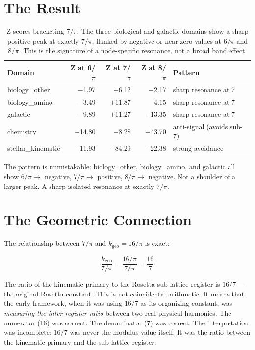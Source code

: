 \documentclass[11pt, letterpaper, openany]{book}
\begin{document}
\section*{The Result}

\begin{table}[H]
\centering
\renewcommand{\arraystretch}{1.3}
\begin{tabular}{|l|r|r|r|l|}
\hline
\textbf{Domain} & \textbf{Z at 6/$\pi$} & \textbf{Z at 7/$\pi$} & \textbf{Z at 8/$\pi$} & \textbf{Pattern} \\
\hline\hline
biology\_other    & $-$1.97 & $+$6.12 & $-$2.17 & sharp resonance at 7 \\
biology\_amino    & $-$3.49 & $+$11.87 & $-$4.15 & sharp resonance at 7 \\
galactic          & $-$9.89 & $+$11.27 & $-$13.35 & sharp resonance at 7 \\
chemistry         & $-$14.80 & $-$8.28 & $-$43.70 & anti-signal (avoids sub-7) \\
stellar\_kinematic & $-$11.93 & $-$84.29 & $-$22.38 & strong avoidance \\
\hline
\end{tabular}
\caption{Z-scores bracketing $7/\pi$. The three biological and galactic domains show
a sharp positive peak at exactly $7/\pi$, flanked by negative or near-zero values
at $6/\pi$ and $8/\pi$. This is the signature of a node-specific resonance, not a
broad band effect.}
\label{tab:rosetta_bracket}
\end{table}

The pattern is unmistakable: biology\_other, biology\_amino, and galactic all show
$6/\pi \to$ negative, $7/\pi \to$ positive, $8/\pi \to$ negative. Not a shoulder of
a larger peak. A sharp isolated resonance at exactly $7/\pi$.

\section*{The Geometric Connection}

The relationship between $7/\pi$ and $k_\text{geo} = 16/\pi$ is exact:

\[
\frac{k_\text{geo}}{7/\pi} = \frac{16/\pi}{7/\pi} = \frac{16}{7}
\]

The ratio of the kinematic primary to the Rosetta sub-lattice register is $16/7$ ---
the original Rosetta constant. This is not coincidental arithmetic. It means that the
early framework, when it was using $16/7$ as its organizing constant, was
\emph{measuring the inter-register ratio} between two real physical harmonics. The
numerator (16) was correct. The denominator ($7$) was correct. The interpretation
was incomplete: $16/7$ was never the modulus value itself. It was the ratio between
the kinematic primary and the sub-lattice register.
\end{document}
